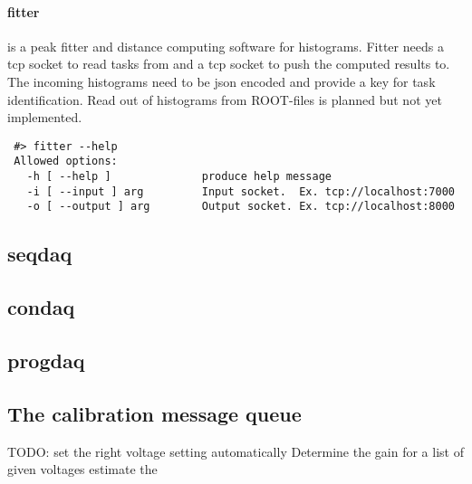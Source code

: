 \paragraph{fitter} is a peak fitter and distance computing software for histograms.
Fitter needs a tcp socket to read tasks from and a tcp socket to push the computed results to.
The incoming histograms need to be json encoded and provide a key for task identification.
Read out of histograms from ROOT-files is planned but not yet implemented.

\begin{verbatim}
 #> fitter --help
 Allowed options:
   -h [ --help ]              produce help message
   -i [ --input ] arg         Input socket.  Ex. tcp://localhost:7000
   -o [ --output ] arg        Output socket. Ex. tcp://localhost:8000

\end{verbatim}

\subsection{seqdaq}
\subsection{condaq}
\subsection{progdaq}

\subsection{The calibration message queue}

TODO: set the right voltage setting automatically
Determine the gain for a list of given voltages estimate the

